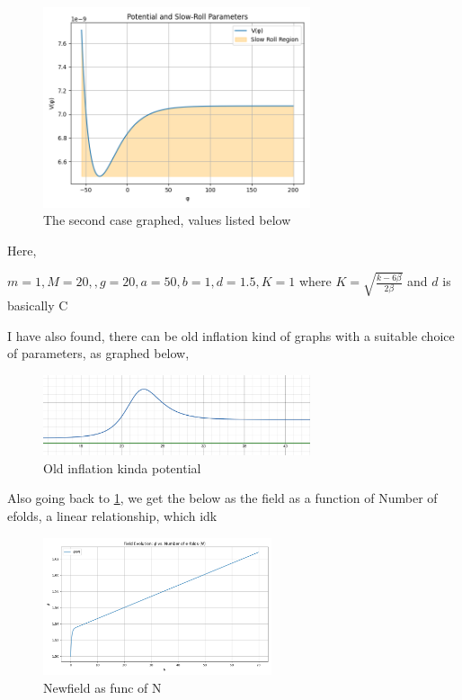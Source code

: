 \documentclass{article}
\begin{document}
\begin{figure}[h!]
    \centering
    \includegraphics[width=0.7\textwidth]{Python/Figures/New Potenial with gravity.png}
    \caption{The second case graphed, values listed below}
    \label{New potential}
\end{figure}

Here,

$   m = 1  , M = 20, ,g = 20, a = 50, b = 1, d = 1.5, K = 1 $
where $K = \sqrt{\frac{k-6\beta}{2\beta}}$ and $d$ is basically C

I have also found, there can be old inflation kind of graphs with a suitable choice of parameters, as graphed below,

\begin{figure}[h!]
    \centering
    \includegraphics[width=0.7\textwidth]{LaTeX/CASE II Potential.png}
    \caption{Old inflation kinda potential}
    \label{Old inflation}
\end{figure}

Also going back to \ref{New potential}, we get the below as the field as a function of Number of efolds, a linear relationship, which idk

\begin{figure}[h!]
    \centering
    \includegraphics[width=0.6\textwidth]{Python/Figures/NewField as a function of N.png}
    \caption{Newfield as func of N}
    \label{Newfield as func of N}
\end{figure}
\end{document}
